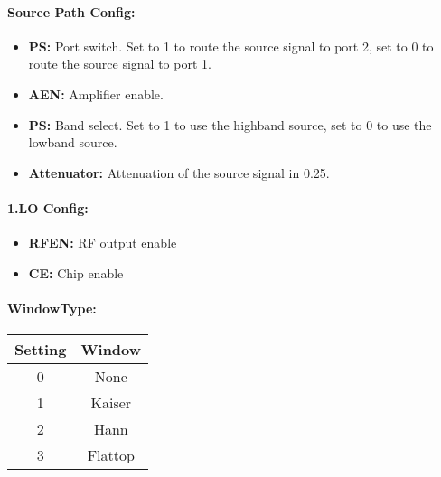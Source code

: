 \documentclass[a4paper,11pt]{article}
\newcommand{\bitrect}[2]{
  \begin{pgfonlayer}{foreground}
    \draw [thick] (0,0) rectangle (#1,1);
    \pgfmathsetmacro\result{#1-1}
    \foreach \x in {1,...,\result}
      \draw [thick] (\x,1) -- (\x, 0.8);
  \end{pgfonlayer}
  \bitlabels{#1}{#2}
}
\newcommand{\rwbits}[3]{
  \draw [thick] (#1,0) rectangle ++(#2,1) node[pos=0.5]{#3};
  \pgfmathsetmacro\start{#1+0.5}
  \pgfmathsetmacro\finish{#1+#2-0.5}
}
\newcommand{\robits}[3]{
  \begin{pgfonlayer}{background}
    \draw [thick, fill=lightgray] (#1,0) rectangle ++(#2,1) node[pos=0.5]{#3};
  \end{pgfonlayer}
  \pgfmathsetmacro\start{#1+0.5}
  \pgfmathsetmacro\finish{#1+#2-0.5}
}
\newcommand{\bitlabels}[2]{
  \foreach \bit in {1,...,#1}{
     \pgfmathsetmacro\result{#2}
     \node [above] at (\bit-0.5, 1) {\pgfmathprintnumber{\result}};
   }
}
\begin{document}
\paragraph{Source Path Config:}
\begin{center}
\end{center}

\begin{itemize}
\item \textbf{PS:} Port switch. Set to 1 to route the source signal to port 2, set to 0 to route the source signal to port 1.
\item \textbf{AEN:} Amplifier enable.
\item \textbf{PS:} Band select. Set to 1 to use the highband source, set to 0 to use the lowband source.
\item \textbf{Attenuator:} Attenuation of the source signal in \SI{0.25}{\dBm}.
\end{itemize}

\paragraph{1.LO Config:}
\begin{center}
\end{center}

\begin{itemize}
\item \textbf{RFEN:} RF output enable
\item \textbf{CE:} Chip enable
\end{itemize}

\paragraph{WindowType:}
\begin{center}
\begin{tabular}{ c|c }
Setting & Window\\
 \hline
0 & None \\
1 & Kaiser\\
2 & Hann\\
3 & Flattop\\
\end{tabular}
\end{center}
\end{document}
